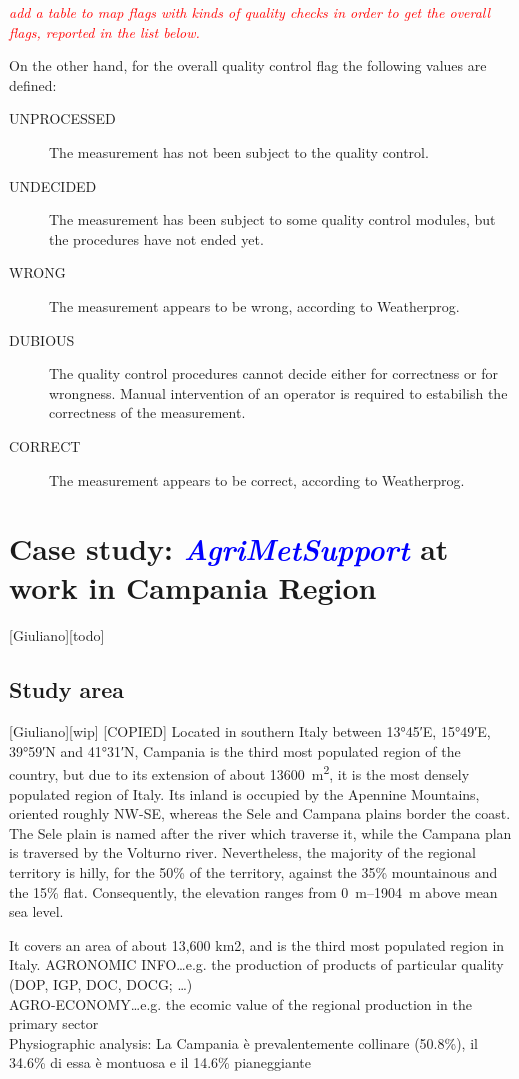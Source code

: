 \documentclass[authoryear,preprint,review,12pt]{elsarticle}
\newcommand{\note}[1]{\emph{\textcolor{red}{#1}}}
\newcommand{\update}[1]{\emph{\textcolor{blue}{#1}}}
\newcommand{\gci}{\update{AgriMetSupport}\xspace}
\begin{document}
\note{add a table to map flags with kinds of quality checks in order to get the overall flags, reported in the list below.}

On the other hand, for the overall quality control flag the following values are defined: 
\begin{description}
	\item[UNPROCESSED] The measurement has not been subject to the quality control.
	\item[UNDECIDED] The measurement has been subject to some quality control modules, but the procedures have not ended yet.
	\item[WRONG] The measurement appears to be wrong, according to Weatherprog.
	\item[DUBIOUS] The quality control procedures cannot decide either for correctness or for wrongness. Manual intervention of an operator is required to estabilish the correctness of the measurement.
	\item[CORRECT] The measurement appears to be correct, according to Weatherprog.
\end{description} 

\section{Case study: \gci at work in Campania Region}[Giuliano][todo] \label{sec:casestudy}

\subsection{Study area}[Giuliano][wip]
[COPIED] Located in southern Italy between \ang{13;45;}E, \ang{15;49;}E, \ang{39;59;}N and \ang{41;31;}N, Campania is the third most populated region of the country, but due to its extension of about \SI{13600}{\metre\squared}, it is the most densely populated region of Italy.
Its inland is occupied by the Apennine Mountains, oriented roughly NW-SE, whereas the Sele and Campana plains border the coast.
The Sele plain is named after the river which traverse it, while the Campana plan is traversed by the Volturno river.
Nevertheless, the majority of the regional territory is hilly, for the 50\% of the territory, against the 35\% mountainous and the 15\% flat.
Consequently, the elevation ranges from \SIrange{0}{1904}{\metre} above mean sea level.

    It covers an area of about 13,600 km2, and is the third most populated region in Italy.
    AGRONOMIC INFO\dots e.g. the production of products of particular quality (DOP, IGP, DOC, DOCG; \dots)\\
    AGRO-ECONOMY\dots e.g. the ecomic value of the regional production in the primary sector\\
    Physiographic analysis: La Campania è prevalentemente collinare (50.8\%), il 34.6\% di essa è montuosa e il 14.6\% pianeggiante\\
    
\end{document}

